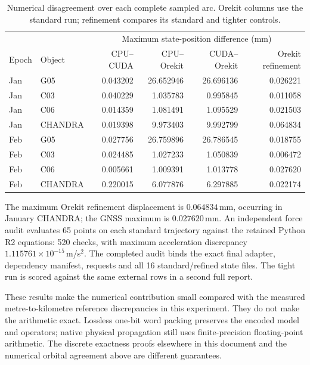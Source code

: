 \begin{table}[htbp]
\centering\small\setlength{\tabcolsep}{5pt}
\begin{tabular}{llrrrr}
\toprule
 & & \multicolumn{4}{c}{Maximum state-position difference (mm)}\\
Epoch & Object & CPU--CUDA & CPU--Orekit & CUDA--Orekit & Orekit refinement\\
\midrule
Jan & G05 & 0.043202 & 26.652946 & 26.696136 & 0.026221\\
Jan & C03 & 0.040229 & 1.035783 & 0.995845 & 0.011058\\
Jan & C06 & 0.014359 & 1.081491 & 1.095529 & 0.021503\\
Jan & CHANDRA & 0.019398 & 9.973403 & 9.992799 & 0.064834\\
Feb & G05 & 0.027756 & 26.759896 & 26.786545 & 0.018755\\
Feb & C03 & 0.024485 & 1.027233 & 1.050839 & 0.006472\\
Feb & C06 & 0.005661 & 1.009391 & 1.013778 & 0.027620\\
Feb & CHANDRA & 0.220015 & 6.077876 & 6.297885 & 0.022174\\
\bottomrule
\end{tabular}
\caption{Numerical disagreement over each complete sampled arc. Orekit columns
use the standard run; refinement compares its standard and tighter controls.}
\label{tab:r18-orbit-numerics}
\end{table}

The maximum Orekit refinement displacement is $0.064834$\,mm, occurring in
January CHANDRA; the GNSS maximum is $0.027620$\,mm. An independent force
audit evaluates 65 points on each standard trajectory against the retained
Python R2 equations: 520 checks, with maximum acceleration discrepancy
$1.115761\times10^{-15}$\,m/s$^2$. The completed audit binds the exact final
adapter, dependency manifest, requests and all 16 standard/refined state files.
The tight run is scored against the same external rows in a second full report.

These results make the numerical contribution small compared with the measured
metre-to-kilometre reference discrepancies in this experiment. They do not make
the arithmetic exact. Lossless one-bit word packing preserves the encoded model
and operators; native physical propagation still uses finite-precision
floating-point arithmetic. The discrete exactness proofs elsewhere in this
document and the numerical orbital agreement above are different guarantees.

